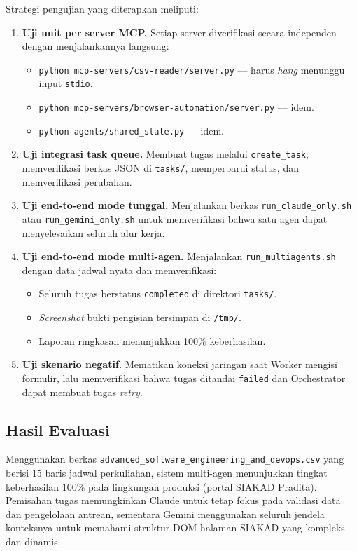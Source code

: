 Strategi pengujian yang diterapkan meliputi:
\begin{enumerate}
  \item \textbf{Uji unit per server MCP.} Setiap server diverifikasi secara independen dengan menjalankannya langsung:
    \begin{itemize}
      \item \texttt{python mcp-servers/csv-reader/server.py} --- harus \textit{hang} menunggu input \texttt{stdio}.
      \item \texttt{python mcp-servers/browser-automation/server.py} --- idem.
      \item \texttt{python agents/shared\_state.py} --- idem.
    \end{itemize}
  \item \textbf{Uji integrasi task queue.} Membuat tugas melalui \texttt{create\_task}, memverifikasi berkas JSON di \texttt{tasks/}, memperbarui status, dan memverifikasi perubahan.
  \item \textbf{Uji end-to-end mode tunggal.} Menjalankan berkas \texttt{run\_claude\_only.sh} atau \texttt{run\_gemini\_only.sh} untuk memverifikasi bahwa satu agen dapat menyelesaikan seluruh alur kerja.
  \item \textbf{Uji end-to-end mode multi-agen.} Menjalankan \texttt{run\_multiagents.sh} dengan data jadwal nyata dan memverifikasi:
    \begin{itemize}
      \item Seluruh tugas berstatus \texttt{completed} di direktori \texttt{tasks/}.
      \item \textit{Screenshot} bukti pengisian tersimpan di \texttt{/tmp/}.
      \item Laporan ringkasan menunjukkan 100\% keberhasilan.
    \end{itemize}
  \item \textbf{Uji skenario negatif.} Mematikan koneksi jaringan saat Worker mengisi formulir, lalu memverifikasi bahwa tugas ditandai \texttt{failed} dan Orchestrator dapat membuat tugas \textit{retry}.
\end{enumerate}

\subsection{Hasil Evaluasi}

Menggunakan berkas \texttt{advanced\_software\_engineering\_and\_devops.csv} yang berisi 15 baris jadwal perkuliahan, sistem multi-agen menunjukkan tingkat keberhasilan 100\% pada lingkungan produksi (portal SIAKAD Pradita). Pemisahan tugas memungkinkan Claude untuk tetap fokus pada validasi data dan pengelolaan antrean, sementara Gemini menggunakan seluruh jendela konteksnya untuk memahami struktur DOM halaman SIAKAD yang kompleks dan dinamis.

